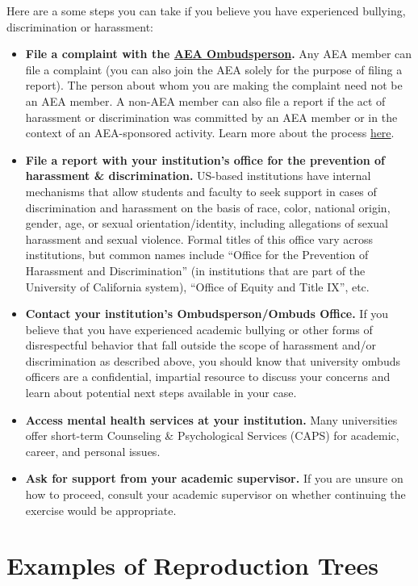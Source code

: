 \documentclass[]{book}
\providecommand{\tightlist}{%
  \setlength{\itemsep}{0pt}\setlength{\parskip}{0pt}}
\begin{document}
Here are a some steps you can take if you believe you have experienced bullying, discrimination or harassment:

\begin{itemize}
\tightlist
\item
  \textbf{File a complaint with the \href{https://www.aeaweb.org/about-aea/aea-ombudsperson}{AEA Ombudsperson}.} Any AEA member can file a complaint (you can also join the AEA solely for the purpose of filing a report). The person about whom you are making the complaint need not be an AEA member. A non-AEA member can also file a report if the act of harassment or discrimination was committed by an AEA member or in the context of an AEA-sponsored activity. Learn more about the process \href{https://www.aeaweb.org/about-aea/aea-ombudsperson/faq}{here}.
\item
  \textbf{File a report with your institution's office for the prevention of harassment \& discrimination.} US-based institutions have internal mechanisms that allow students and faculty to seek support in cases of discrimination and harassment on the basis of race, color, national origin, gender, age, or sexual orientation/identity, including allegations of sexual harassment and sexual violence. Formal titles of this office vary across institutions, but common names include ``Office for the Prevention of Harassment and Discrimination'' (in institutions that are part of the University of California system), ``Office of Equity and Title IX'', etc.
\item
  \textbf{Contact your institution's Ombudsperson/Ombuds Office.} If you believe that you have experienced academic bullying or other forms of disrespectful behavior that fall outside the scope of harassment and/or discrimination as described above, you should know that university ombuds officers are a confidential, impartial resource to discuss your concerns and learn about potential next steps available in your case.
\item
  \textbf{Access mental health services at your institution.} Many universities offer short-term Counseling \& Psychological Services (CAPS) for academic, career, and personal issues.
\item
  \textbf{Ask for support from your academic supervisor.} If you are unsure on how to proceed, consult your academic supervisor on whether continuing the exercise would be appropriate.
\end{itemize}

\hypertarget{examples-of-reproduction-trees}{%
\chapter{Examples of Reproduction Trees}\label{examples-of-reproduction-trees}}
\end{document}
